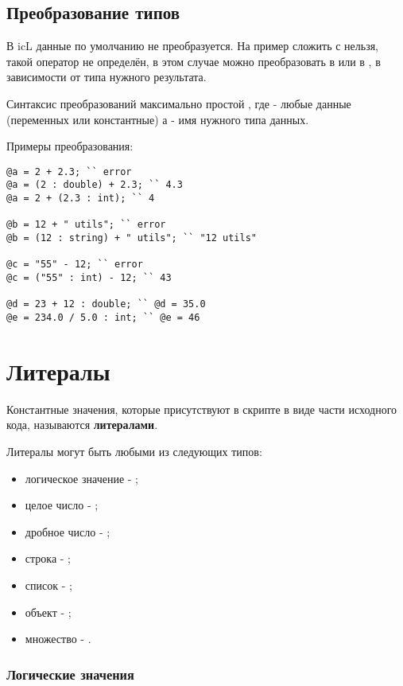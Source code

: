 \documentclass[a4paper, 14pt]{extarticle}
\newenvironment{icItems}
	{ \begin{itemize} [noitemsep,nolistsep] }
	{ \end{itemize} }
\begin{document}
\subsection{Преобразование типов}

В icL данные по умолчанию не преобразуется. На пример сложить \integer{} с \double{} нельзя, такой оператор не определён, в этом случае можно преобразовать \integer{} в \double{} или \double{} в \integer{}, в зависимости от типа нужного результата.

Синтаксис преобразований максимально простой , где  - любые данные (переменных или константные) а  - имя нужного типа данных.

\noindent Примеры преобразования:
\begin{lstlisting}
@a = 2 + 2.3; `` error
@a = (2 : double) + 2.3; `` 4.3
@a = 2 + (2.3 : int); `` 4

@b = 12 + " utils"; `` error
@b = (12 : string) + " utils"; `` "12 utils"

@c = "55" - 12; `` error
@c = ("55" : int) - 12; `` 43

@d = 23 + 12 : double; `` @d = 35.0
@e = 234.0 / 5.0 : int; `` @e = 46
\end{lstlisting}

\section{Литералы}

Константные значения, которые присутствуют в скрипте в виде части исходного кода, называются {\bf литералами}.

Литералы могут быть любыми из следующих типов:

\begin{icItems}
	\item
		логическое значение - \bool{};
	\item
		целое число - \integer{};
	\item
		дробное число - \double{};
	\item
		строка - \str{};
	\item
		список - \listtype{};
	\item
		объект - \object{};
	\item
		множество - \set{}.
\end{icItems}

\subsubsection{Логические значения}
\end{document}
